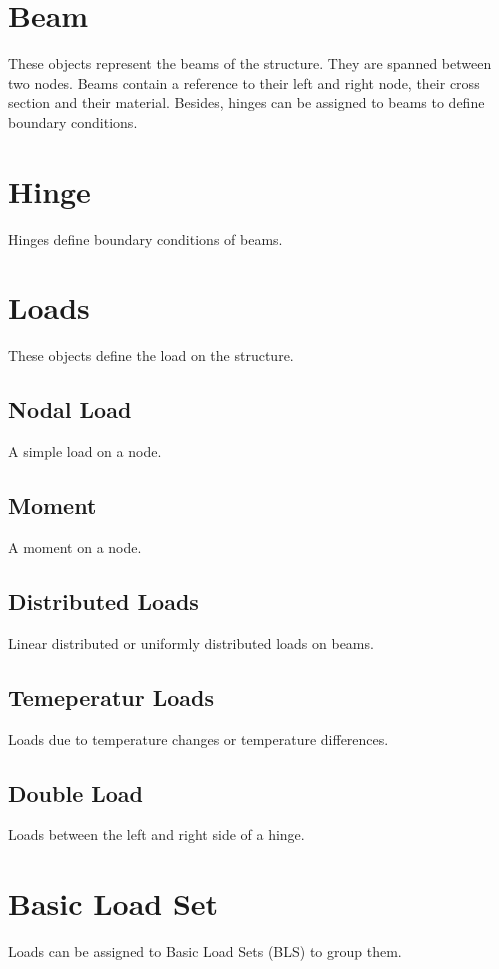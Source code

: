 \documentclass[a4paper,11pt]{report}
\begin{document}
\section{Beam}
These objects represent the beams of the structure. They are spanned between two nodes. Beams contain a reference to their left and right node, their cross section and their material. Besides, hinges can be assigned to beams to define boundary conditions.

\section{Hinge}
Hinges define boundary conditions of beams. 

\section{Loads}
These objects define the load on the structure.

\subsection{Nodal Load}
A simple load on a node.

\subsection{Moment}
A moment on a node.

\subsection{Distributed Loads}
Linear distributed or uniformly distributed loads on beams.

\subsection{Temeperatur Loads}
Loads due to temperature changes or temperature differences.
 
\subsection{Double Load} 
Loads between the left and right side of a hinge.

\section{Basic Load Set}
Loads can be assigned to Basic Load Sets (BLS) to group them.
\end{document}
